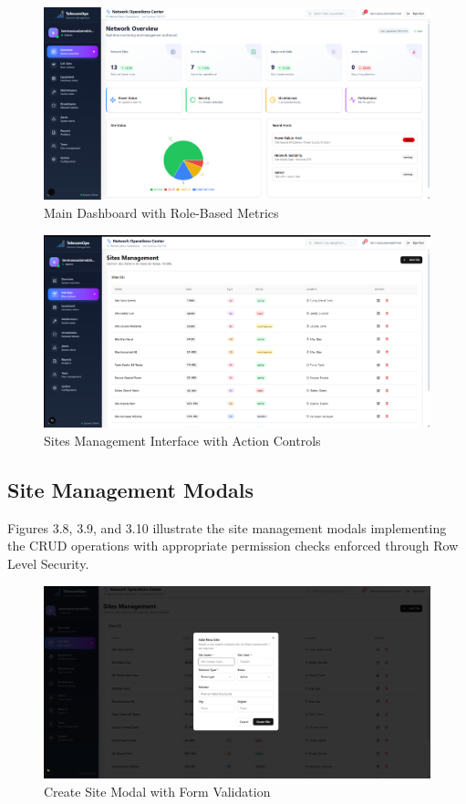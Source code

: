 \begin{figure}[H]
    \centering
    \includegraphics[width=0.9\linewidth]{img/chap_03/dashboard_main.png}
    \caption{Main Dashboard with Role-Based Metrics}
    \label{fig:dashboard_main}
\end{figure}

\begin{figure}[H]
    \centering
    \includegraphics[width=0.9\linewidth]{img/chap_03/sites_list.png}
    \caption{Sites Management Interface with Action Controls}
    \label{fig:sites_list}
\end{figure}

\subsection{Site Management Modals}

Figures 3.8, 3.9, and 3.10 illustrate the site management modals implementing the CRUD operations with appropriate permission checks enforced through Row Level Security.

\begin{figure}[H]
    \centering
    \includegraphics[width=0.85\linewidth]{img/chap_03/create_site_modal.png}
    \caption{Create Site Modal with Form Validation}
    \label{fig:add_site_modal}
\end{figure}

